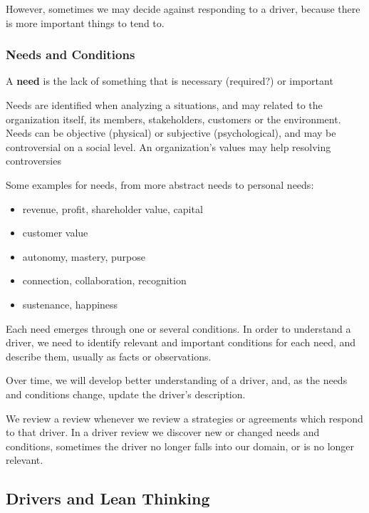 However, sometimes we may decide against responding to a driver, because there is more important things to tend to.

\subsubsection{Needs and Conditions}
\label{needsandconditions}

A \textbf{need} is the lack of something that is necessary (required?) or important

Needs are identified when analyzing a situations, and may related to the organization itself, its members, stakeholders, customers or the environment.
Needs can be objective (physical) or subjective (psychological), and may be controversial on a social level. An organization's values may help resolving controversies

Some examples for needs, from more abstract needs to personal needs:

\begin{itemize}
\item revenue, profit, shareholder value, capital

\item customer value

\item autonomy, mastery, purpose

\item connection, collaboration, recognition

\item sustenance, happiness

\end{itemize}

Each need emerges through one or several conditions. In order to understand a driver, we need to identify relevant and important conditions for each need, and describe them, usually as facts or observations.

Over time, we will develop better understanding of a driver, and, as the needs and conditions change, update the driver's description.

We review a review whenever we review a strategies or agreements which respond to that driver. In a driver review we discover new or changed needs and conditions, sometimes the driver no longer falls into our domain, or is no longer relevant.

\subsection{Drivers and Lean Thinking}
\label{driversandleanthinking}

